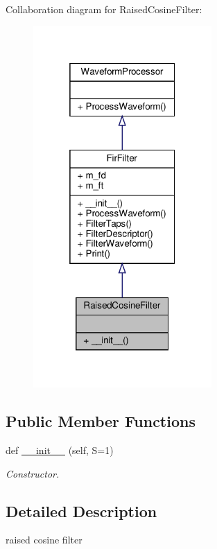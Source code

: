 Collaboration diagram for Raised\+Cosine\+Filter\+:
\nopagebreak
\begin{figure}[H]
\begin{center}
\leavevmode
\includegraphics[width=193pt]{classSignalIntegrity_1_1TimeDomain_1_1Filters_1_1RaisedCosineFilter_1_1RaisedCosineFilter__coll__graph}
\end{center}
\end{figure}
\subsection*{Public Member Functions}
\begin{DoxyCompactItemize}
\item 
def \hyperlink{classSignalIntegrity_1_1TimeDomain_1_1Filters_1_1RaisedCosineFilter_1_1RaisedCosineFilter_a59c1eb244c4627d0d84564a3dffb5687}{\+\_\+\+\_\+init\+\_\+\+\_\+} (self, S=1)
\begin{DoxyCompactList}\small\item\em Constructor. \end{DoxyCompactList}\end{DoxyCompactItemize}


\subsection{Detailed Description}
raised cosine filter 

